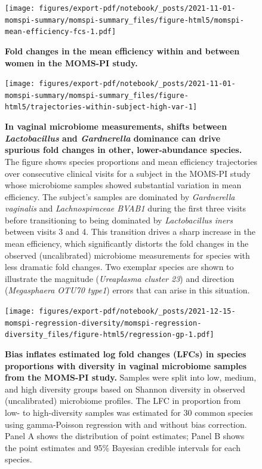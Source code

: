 \documentclass[
]{article}
\begin{document}
\begin{figure}
\centering
\texttt{[image: figures/export-pdf/notebook/\_posts/2021-11-01-momspi-summary/momspi-summary\_files/figure-html5/momspi-mean-efficiency-fcs-1.pdf]}
\caption{\label{fig:momspi-mean-efficiency-fcs}\textbf{Fold changes in the mean efficiency within and between women in the MOMS-PI study.}}
\end{figure}



\begin{figure}
\texttt{[image: figures/export-pdf/notebook/\_posts/2021-11-01-momspi-summary/momspi-summary\_files/figure-html5/trajectories-within-subject-high-var-1]} \caption{\textbf{In vaginal microbiome measurements, shifts between \emph{Lactobacillus} and \emph{Gardnerella} dominance can drive spurious fold changes in other, lower-abundance species.} The figure shows species proportions and mean efficiency trajectories over consecutive clinical visits for a subject in the MOMS-PI study whose microbiome samples showed substantial variation in mean efficiency. The subject's samples are dominated by \emph{Gardnerella vaginalis} and \emph{Lachnospiraceae BVAB1} during the first three visits before transitioning to being dominated by \emph{Lactobacillus iners} between visits 3 and 4. This transition drives a sharp increase in the mean efficiency, which significantly distorts the fold changes in the observed (uncalibrated) microbiome measurements for species with less dramatic fold changes. Two exemplar species are shown to illustrate the magnitude (\emph{Ureaplasma cluster 23}) and direction (\emph{Megasphaera OTU70 type1}) errors that can arise in this situation.}\label{fig:momspi-trajectory}
\end{figure}



\begin{figure}
\centering
\texttt{[image: figures/export-pdf/notebook/\_posts/2021-12-15-momspi-regression-diversity/momspi-regression-diversity\_files/figure-html5/regression-gp-1.pdf]}
\caption{\label{fig:momspi-regression}\textbf{Bias inflates estimated log fold changes (LFCs) in species proportions with diversity in vaginal microbiome samples from the MOMS-PI study.} Samples were split into low, medium, and high diversity groups based on Shannon diversity in observed (uncalibrated) microbiome profiles. The LFC in proportion from low- to high-diversity samples was estimated for 30 common species using gamma-Poisson regression with and without bias correction. Panel A shows the distribution of point estimates; Panel B shows the point estimates and 95\% Bayesian credible intervals for each species.}
\end{figure}
\end{document}
